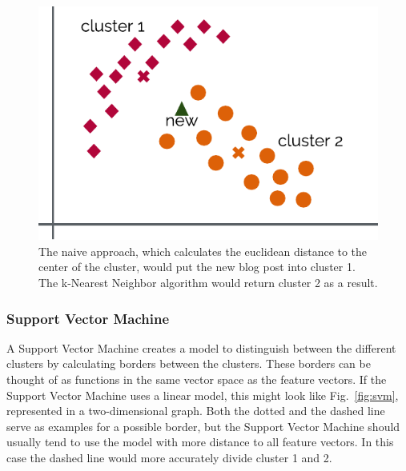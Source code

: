 \begin{figure}
    \centering
    \includegraphics[]{images/naive.pdf}
    \caption{The naive approach, which calculates the euclidean distance to the center of the cluster, would put the new blog post into cluster 1. The k-Nearest Neighbor algorithm would return cluster 2 as a result.}
    \label{fig:naive}
\end{figure}


\subsubsection{Support Vector Machine}
\label{sec:support_vector_machine}


A Support Vector Machine creates a model to distinguish between the different clusters by calculating borders between the clusters.
These borders can be thought of as functions in the same vector space as the feature vectors.
If the Support Vector Machine uses a linear model, this might look like Fig.~\ref{fig:svm}, represented in a two-dimensional graph.
Both the dotted and the dashed line serve as examples for a possible border, but the Support Vector Machine should usually tend to use the model with more distance to all feature vectors.
In this case the dashed line would more accurately divide cluster 1 and 2.



